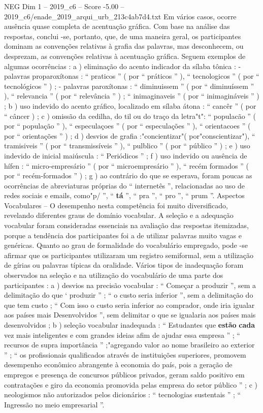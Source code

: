\begin{textsample}{NEG Dim 1 – 2019\_c6 – Score -5.00 – 2019\_c6/enade\_2019\_arqui\_urb\_213c4ab7d4.txt}
Em vários casos, ocorre ausência quase completa de acentuação gráfica.
Com base na análise das respostas, conclui -se, portanto, que, de uma maneira geral, os participantes dominam as convenções relativas à grafia das palavras, mas desconhecem, ou desprezam, as convenções relativas à acentuação gráfica.
Seguem exemplos de algumas ocorrências : a ) eliminação do acento indicador da sílaba tônica : - palavras proparoxítonas : “ praticos ” ( por “ práticos ” ), “ tecnologicos ” ( por “ tecnológicos ” ) ; - palavras paroxítonas : “ diminuissem ” ( por “ diminuíssem ” ), “ relevancia ” ( por “ relevância ” ) ; “ inimaginaveis ” ( por “ inimagináveis ” ) ; b ) uso indevido do acento gráfico, localizado em sílaba átona : “ cancêr ” ( por “ câncer ) ; c ) omissão da cedilha, do til ou do traço da letra"t": “ populacão ” ( por “ população ” ), “ especulaçoes ” ( por “ especulações ” ), “ orientacoes ” ( por “ orientações ” ) ; d ) desvios de grafia :"concientizar"( por"conscientizar"), “ tramisiveis ” ( por “ transmissíveis ” ), “ pulblico ” ( por “ público ” ) ; e ) uso indevido de inicial maiúscula : “ Periódicos ” ; f ) uso indevido ou ausência de hífen : “ micro-empresário ” ( por “ microempresário ” ), “ recém formados ” ( por “ recém-formados ” ) ; g ) ao contrário do que se esperava, foram poucas as ocorrências de abreviaturas próprias do “ internetês ”, relacionadas ao uso de redes sociais e emails, como"p/ ”, “ \textbf{tá} ”, “ pra ”, “ pro ”, “ prum ”.
Aspectos Vocabulares – O desempenho nesta competência foi muito diversificado, revelando diferentes graus de domínio vocabular.
A seleção e a adequação vocabular foram consideradas essenciais na avaliação das respostas itemizadas, porque a tendência dos participantes foi a de utilizar palavras muito vagas e genéricas.
Quanto ao grau de formalidade do vocabulário empregado, pode -se afirmar que os participantes utilizaram um registro semiformal, sem a utilização de gírias ou palavras típicas da oralidade.
Vários tipos de inadequação foram observados na seleção e na utilização do vocabulário de uma parte dos participantes : a ) desvios na precisão vocabular : “ Começar a produzir ”, sem a delimitação do que ‘ produzir ” ; “ o custo seria inferior ”, sem a delimitação do que tem custo ; “ Com isso o custo seria inferior ao comprador, onde iria igualar aos países mais Desenvolvidos ”, sem delimitar o que se igualaria aos países mais desenvolvidos ; b ) seleção vocabular inadequada : “ Estudantes que \textbf{estão} \textbf{cada} vez mais inteligentes e com grandes ideias afim de ajudar essa empresa ” ; “ recursos de supra importância ” ;"agregando valor ao nome brasileiro ao exterior ” ; “ os profissionais qualificados através de instituições superiores, promovem desempenho econômico abrangente à economia do país, pois a geração de empregos e presença de concursos públicos privados, geram saldo positivo em contratações e giro da economia promovida pelas empresa do setor público ” ; c ) neologismos não autorizados pelos dicionários : “ tecnologias sustentais ” ; “ Ingressão no meio empresarial ”.

\end{textsample}
